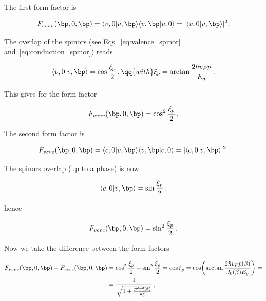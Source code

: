 The first form factor is

\begin{equation}
    F_{vvvv}(\bp ,0,\bp) = \langle v,0 | v, \bp \rangle \langle v,\bp | v, 0 \rangle = |\langle v,0 | v, \bp \rangle|^2.
\end{equation}

\noindent The overlap of the spinors (see Eqs.~\eqref{eq:valence_spinor} and~\eqref{eq:conduction_spinor}) reads

\begin{equation}
    \langle v,0 | v, \bp \rangle = \cos \frac{\xi_p}{2} \,, \qq{with} \xi_p = \arctan \frac{2 \hbar v_F p}{E_g}\,.
\end{equation}

\noindent This gives for the form factor

\begin{equation}
    F_{vvvv}(\bp ,0,\bp) = \cos^2\frac{\xi_p}{2} \,.
\end{equation}

The second form factor is

\begin{equation}
    F_{vcvc}(\bp ,0,\bp) = \langle c,0 | v, \bp \rangle \langle v,\bp | c, 0 \rangle = |\langle c,0 | v, \bp \rangle|^2.
\end{equation}

\noindent The spinors overlap (up to a phase) is now

\begin{equation}
    \langle c,0 | v, \bp \rangle = \sin \frac{\xi_p}{2} \,,
\end{equation}

\noindent hence

\begin{equation}
    F_{vcvc}(\bp ,0,\bp) = \sin^2\frac{\xi_p}{2} \,.
\end{equation}

\noindent Now we take the difference between the form factors

\begin{equation}
    \begin{split}
        F_{vvvv}(\bp ,0,\bp) - F_{vcvc}(\bp,0,\bp) &= \cos^2\frac{\xi_p}{2} - \sin^2\frac{\xi_p}{2} = \cos \xi_p = \cos \! \left(  \arctan \frac{2 \hbar v_F p(\beta)}{J_0(\beta) E_g} \right) = \\
        &= \frac{1}{\sqrt{1 + \frac{p^2 \gamma^2(\theta)}{k_0^2}}} \,,
    \end{split}
\end{equation}

